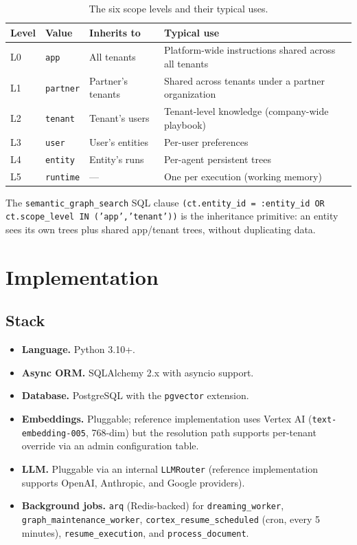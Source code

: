 \documentclass[11pt,a4paper]{article}
\theoremstyle{cortexprop}
\newcommand{\code}[1]{\texttt{#1}}
\begin{document}
\begin{table}[h]
\centering
\caption{The six scope levels and their typical uses.}
\label{tab:scope}
\small
\begin{tabularx}{\linewidth}{lll>{\raggedright\arraybackslash}X}
\toprule
\textbf{Level} & \textbf{Value} & \textbf{Inherits to} & \textbf{Typical use}\\
\midrule
L0 & \code{app} & All tenants & Platform-wide instructions shared across all tenants \\
L1 & \code{partner} & Partner's tenants & Shared across tenants under a partner organization \\
L2 & \code{tenant} & Tenant's users & Tenant-level knowledge (company-wide playbook) \\
L3 & \code{user} & User's entities & Per-user preferences \\
L4 & \code{entity} & Entity's runs & Per-agent persistent trees \\
L5 & \code{runtime} & --- & One per execution (working memory) \\
\bottomrule
\end{tabularx}
\end{table}

The \code{semantic\_graph\_search} SQL clause
\code{(ct.entity\_id = :entity\_id OR ct.scope\_level IN ('app','tenant'))}
is the inheritance primitive: an entity sees its own trees plus shared
app/tenant trees, without duplicating data.

\section{Implementation}
\label{sec:impl}

\subsection{Stack}

\begin{itemize}
  \item \textbf{Language.} Python 3.10+.
  \item \textbf{Async ORM.} SQLAlchemy 2.x with asyncio support.
  \item \textbf{Database.} PostgreSQL with the \code{pgvector} extension.
  \item \textbf{Embeddings.} Pluggable; reference implementation uses
  Vertex AI (\code{text-embedding-005}, 768-dim) but the resolution path
  supports per-tenant override via an admin configuration table.
  \item \textbf{LLM.} Pluggable via an internal \code{LLMRouter}
  (reference implementation supports OpenAI, Anthropic, and Google
  providers).
  \item \textbf{Background jobs.} \code{arq} (Redis-backed) for
  \code{dreaming\_worker}, \code{graph\_maintenance\_worker},
  \code{cortex\_resume\_scheduled} (cron, every 5 minutes),
  \code{resume\_execution}, and \code{process\_document}.
\end{itemize}
\end{document}
